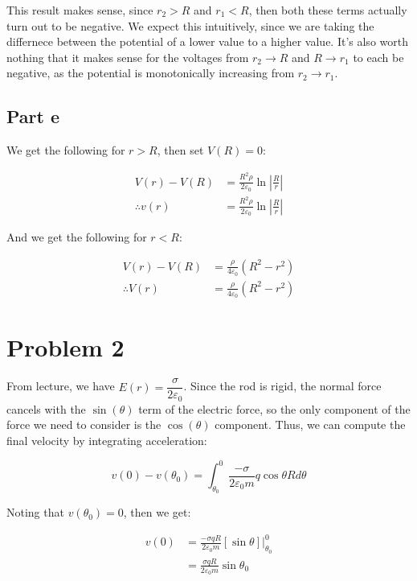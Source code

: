 \documentclass{article}
\theoremstyle{definition}
\numberwithin{equation}{section}
\numberwithin{definition}{section}
\begin{document}
    This result makes sense, since $r_2 >R$ and $r_1 < R$, then both these terms actually turn out to be negative. We expect this intuitively, since we are taking the differnece between the potential of a lower value to a higher value. It's also worth nothing that it makes sense for the voltages from $r_2 \to R$ and $R \to r_1$ to each be negative, as the potential is monotonically increasing from $r_2 \to r_1$.

    \subsection{Part e}

    We get the following for $r > R$, then set $V(R) = 0$:

    \begin{align*}
        V(r) - V(R) &= \frac{R^2\rho}{2\varepsilon_0} \ln \left|\frac{R}{r}\right|\\
        \therefore v(r) &= \frac{R^2\rho}{2\varepsilon_0}\ln\left|\frac{R}{r}\right|
    \end{align*}

    And we get the following for $r < R$:

    \begin{align*}
        V(r) - V(R) &= \frac{\rho}{4\varepsilon_0}(R^2 - r^2)\\
        \therefore V(r) &= \frac{\rho}{4\varepsilon_0}(R^2 - r^2)
    \end{align*}


    \section{Problem 2}

    From lecture, we have $E(r) = \dfrac{\sigma}{2\varepsilon_0}$. Since the rod is rigid, the normal force cancels with the $\sin(\theta)$ term of the electric force, so the only component of the force we need to consider is the $\cos(\theta)$ component. Thus, we can compute the final velocity by integrating acceleration:

     \[   v(0) - v(\theta_0) = \int_{\theta_0}^0 \frac{-\sigma}{2\varepsilon_0m}q \cos \theta R d\theta\]

    Noting that $v(\theta_0) = 0$, then we get:


    \begin{align*}
        v(0) &= \frac{-\sigma qR}{2\varepsilon_0m}[\sin\theta]\bigg|_{\theta_0}^0\\
        &= \frac{\sigma q R}{2\varepsilon_0m}\sin\theta_0
    \end{align*}
\end{document}
